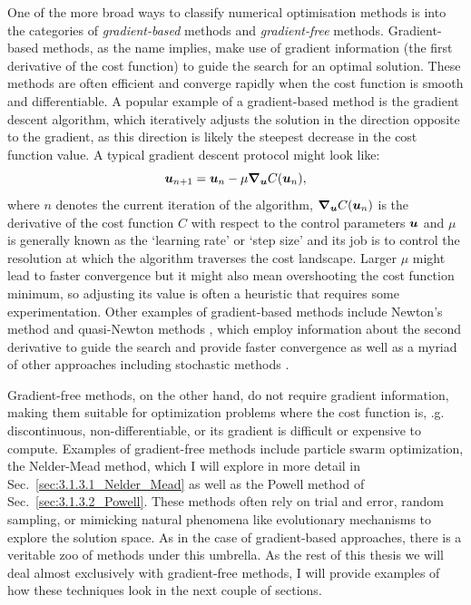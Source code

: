 One of the more broad ways to classify numerical optimisation methods is into the categories of \emph{gradient-based} methods and \emph{gradient-free} methods. Gradient-based methods, as the name implies, make use of gradient information (the first derivative of the cost function) to guide the search for an optimal solution. These methods are often efficient and converge rapidly when the cost function is smooth and differentiable. A popular example of a gradient-based method is the gradient descent algorithm, which iteratively adjusts the solution in the direction opposite to the gradient, as this direction is likely the steepest decrease in the cost function value. A typical gradient descent protocol might look like:
\begin{equation}\label{eq:gradient_descent}
    \boldsymbol{u}_{n + 1} = \boldsymbol{u}_n - \mu \grad_{\boldsymbol{u}} C(\boldsymbol{u}_n),
\end{equation}
where $n$ denotes the current iteration of the algorithm, $\grad_{\boldsymbol{u}} C(\boldsymbol{u}_n)$ is the derivative of the cost function $C$ with respect to the control parameters $\boldsymbol{u}$ and $\mu$ is generally known as the `learning rate' or `step size' and its job is to control the resolution at which the algorithm traverses the cost landscape. Larger $\mu$ might lead to faster convergence but it might also mean overshooting the cost function minimum, so adjusting its value is often a heuristic that requires some experimentation. Other examples of gradient-based methods include Newton's method and quasi-Newton methods \cite{suli_introduction_2003}, which employ information about the second derivative to guide the search and provide faster convergence as well as a myriad of other approaches including stochastic methods \cite{bottou_tradeoffs_2007}. 

Gradient-free methods, on the other hand, do not require gradient information, making them suitable for optimization problems where the cost function is, \@e.g.~ discontinuous, non-differentiable, or its gradient is difficult or expensive to compute. Examples of gradient-free methods include particle swarm optimization\cite{bonyadi_particle_2017}, the Nelder-Mead method, which I will explore in more detail in Sec.~\ref{sec:3.1.3.1_Nelder_Mead} as well as the Powell method of Sec.~\ref{sec:3.1.3.2_Powell}. These methods often rely on trial and error, random sampling, or mimicking natural phenomena like evolutionary mechanisms\cite{vikhar_evolutionary_2016} to explore the solution space. As in the case of gradient-based approaches, there is a veritable zoo of methods under this umbrella. As the rest of this thesis we will deal almost exclusively with gradient-free methods, I will provide examples of how these techniques look in the next couple of sections.

